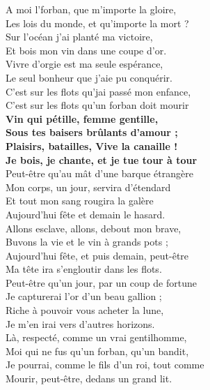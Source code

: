 A moi l'forban, que m'importe la gloire,\\
Les lois du monde, et qu'importe la mort ? \\
Sur l'océan j'ai planté ma victoire,\\
Et bois mon vin dans une coupe d'or. \\
Vivre d'orgie est ma seule espérance, \\
Le seul bonheur que j'aie pu conquérir. \\
C'est sur les flots qu'jai passé mon enfance, \\
C'est sur les flots qu'un forban doit mourir\\
\bigskip
\textbf{Vin qui pétille, femme gentille, \\
Sous tes baisers brûlants d'amour ; \\
Plaisirs, batailles, Vive la canaille ! \\
Je bois, je chante, et je tue tour à tour\\}
\bigskip
Peut-être qu'au mât d'une barque étrangère\\
Mon corps, un jour, servira d'étendard\\
Et tout mon sang rougira la galère\\
Aujourd'hui fête et demain le hasard. \\
Allons esclave, allons, debout mon brave,\\
Buvons la vie et le vin à grands pots ; \\
Aujourd'hui fête, et puis demain, peut-être \\
Ma tête ira s'engloutir dans les flots.\\
\bigskip
Peut-être qu'un jour, par un coup de fortune \\
Je capturerai l'or d'un beau gallion ;\\
Riche à pouvoir vous acheter la lune, \\
Je m'en irai vers d'autres horizons. \\
Là, respecté, comme un vrai gentilhomme, \\
Moi qui ne fus qu'un forban, qu'un bandit, \\
Je pourrai, comme le fils d'un roi, tout comme \\
Mourir, peut-être, dedans un grand lit.\\
\bigskip
